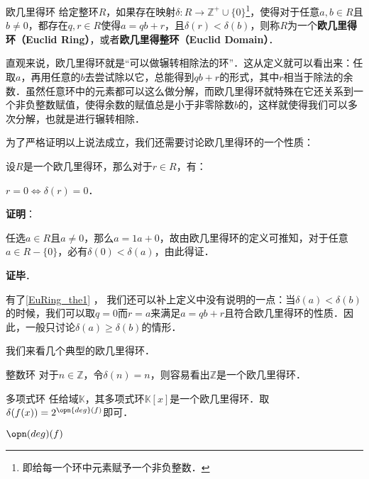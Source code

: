 

\begin{definition}{欧几里得环}
给定整环$R$，如果存在映射$\delta:R\to\mathbb{Z}^+\cup\{0\}$\footnote{即给每一个环中元素赋予一个非负整数．}，使得对于任意$a, b\in R$且$b\not=0$，都存在$q, r\in R$使得$a=qb+r$，且$\delta(r)<\delta(b)$，则称$R$为一个\textbf{欧几里得环（Euclid Ring）}，或者\textbf{欧几里得整环（Euclid Domain）}．
\end{definition}



直观来说，欧几里得环就是“可以做辗转相除法的环”．这从定义就可以看出来：任取$a$，再用任意的$b$去尝试除以它，总能得到$qb+r$的形式，其中$r$相当于除法的余数．虽然任意环中的元素都可以这么做分解，而欧几里得环就特殊在它还关系到一个非负整数赋值，使得余数的赋值总是小于非零除数$b$的，这样就使得我们可以多次分解，也就是进行辗转相除．

为了严格证明以上说法成立，我们还需要讨论欧几里得环的一个性质：

\begin{theorem}{}\label{EuRing_the1}
设$R$是一个欧几里得环，那么对于$r\in R$，有：

$r=0\iff \delta(r)=0$．
\end{theorem}

\textbf{证明}：

任选$a\in R$且$a\not=0$，那么$a=1a+0$，故由欧几里得环的定义可推知，对于任意$a\in R-\{0\}$，必有$\delta(0)<\delta(a)$，由此得证．

\textbf{证毕}．

有了\autoref{EuRing_the1} ， 我们还可以补上定义中没有说明的一点：当$\delta(a)<\delta(b)$的时候，我们可以取$q=0$而$r=a$来满足$a=qb+r$且符合欧几里得环的性质．因此，一般只讨论$\delta(a)\geq\delta(b)$的情形．

我们来看几个典型的欧几里得环．

\begin{example}{整数环}
对于$n\in\mathbb{Z}$，令$\delta(n)=n$，则容易看出$\mathbb{Z}$是一个欧几里得环．
\end{example}

\begin{example}{多项式环}
任给域$\mathbb{K}$，其多项式环$\mathbb{K}[x]$是一个欧几里得环．取$\delta(f(x))=2^{\opn{deg}(f)}$即可．
\end{example}

$\opn(deg)(f)$



